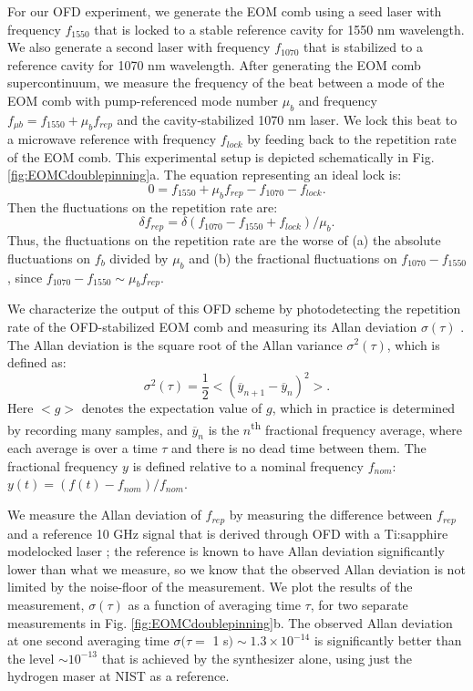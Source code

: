 For our OFD experiment, we generate the EOM comb using a seed laser with frequency $f_{1550}$ that is locked to a stable reference cavity for 1550 nm wavelength. We also generate a second laser with frequency $f_{1070}$ that is stabilized to a reference cavity for 1070 nm wavelength. After generating the EOM comb supercontinuum, we measure the frequency of the beat between a mode of the EOM comb with pump-referenced mode number $\mu_b$ and frequency $f_{\mu b}=f_{1550}+\mu_b f_{rep}$ and the cavity-stabilized 1070 nm laser. We lock this beat to a microwave reference with frequency $f_{lock}$ by feeding back to the repetition rate of the EOM comb. This experimental setup is depicted schematically in Fig. \ref{fig:EOMCdoublepinning}a. The equation representing an ideal lock is:
\begin{equation}
0=f_{1550}+\mu_b f_{rep}-f_{1070}-f_{lock}.
\end{equation}
Then the fluctuations on the repetition rate are:
\begin{equation}
\delta f_{rep}=\delta(f_{1070}-f_{1550}+f_{lock})/\mu_b.
\end{equation}
Thus, the fluctuations on the repetition rate are the worse of (a) the absolute fluctuations on $f_b$ divided by $\mu_b$ and (b) the fractional fluctuations on $f_{1070}-f_{1550}$, since $f_{1070}-f_{1550}\sim\mu_b f_{rep}$.

We characterize the output of this OFD scheme by photodetecting the repetition rate of the OFD-stabilized EOM comb and measuring its Allan deviation $\sigma(\tau)$ \cite{Levine1999}. The Allan deviation is the square root of the Allan variance $\sigma^2(\tau)$, which is defined as:
\begin{equation}
\sigma^2(\tau)=\frac{1}{2}<(\overline{y}_{n+1}-\overline{y}_n)^2>.
\end{equation}
Here $<g>$ denotes the expectation value of $g$, which in practice is determined by recording many samples, and $\overline{y}_n$ is the $n$\textsuperscript{th} fractional frequency average, where each average is over a time $\tau$ and there is no dead time between them. The fractional frequency $y$ is defined relative to a nominal frequency $f_{nom}$: $y(t)=(f(t)-f_{nom})/f_{nom}$.

We measure the Allan deviation of $f_{rep}$ by measuring the difference between $f_{rep}$ and a reference 10 GHz signal that is derived through OFD with a Ti:sapphire modelocked laser \cite{Fortier2011}; the reference is known to have Allan deviation significantly lower than what we measure, so we know that the observed Allan deviation is not limited by the noise-floor of the measurement. We plot the results of the measurement, $\sigma(\tau)$ as a function of averaging time $\tau$, for two separate measurements in Fig. \ref{fig:EOMCdoublepinning}b. The observed Allan deviation at one second averaging time $\sigma(\tau=$ 1 s$)\sim1.3\times10^{-14}$ is significantly better than the level $\sim10^{-13}$ that is achieved by the synthesizer alone, using just the hydrogen maser at NIST as a reference.



